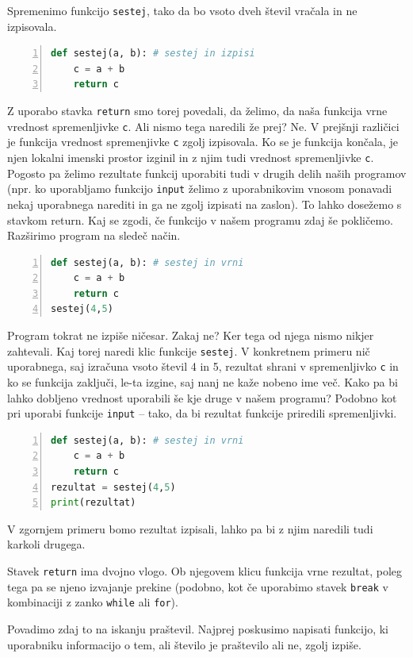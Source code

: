 Spremenimo funkcijo \texttt{sestej}, tako da bo vsoto dveh števil vračala in ne izpisovala.
\begin{lstlisting}[language=Python,numbers=left]
def sestej(a, b): # sestej in izpisi
    c = a + b
    return c
\end{lstlisting}
Z uporabo stavka \texttt{return} smo torej povedali, da želimo, da naša funkcija vrne vrednost spremenljivke \texttt{c}. Ali nismo tega naredili že prej? Ne. V prejšnji različici je funkcija vrednost spremenjivke \texttt{c} zgolj izpisovala. Ko se je funkcija končala, je njen lokalni imenski prostor izginil in z njim tudi vrednost spremenljivke \texttt{c}. Pogosto pa želimo rezultate funkcij uporabiti tudi v drugih delih naših programov (npr. ko uporabljamo funkcijo \texttt{input} želimo z uporabnikovim vnosom ponavadi nekaj uporabnega narediti in ga ne zgolj izpisati na zaslon). To lahko dosežemo s stavkom return. Kaj se zgodi, če funkcijo v našem programu zdaj še pokličemo. Razširimo program na sledeč način.
\begin{lstlisting}[language=Python,numbers=left]
def sestej(a, b): # sestej in vrni
    c = a + b
    return c
sestej(4,5)
\end{lstlisting}
Program tokrat ne izpiše ničesar. Zakaj ne? Ker tega od njega nismo nikjer zahtevali. Kaj torej naredi klic funkcije \texttt{sestej}. V konkretnem primeru nič uporabnega, saj izračuna vsoto števil 4 in 5, rezultat shrani v spremenljivko \texttt{c} in ko se funkcija zaključi, le-ta izgine, saj nanj ne kaže nobeno ime več. Kako pa bi lahko dobljeno vrednost uporabili še kje druge v našem programu? Podobno kot pri uporabi funkcije \texttt{input} -- tako, da bi rezultat funkcije priredili spremenljivki.
\begin{lstlisting}[language=Python,numbers=left]
def sestej(a, b): # sestej in vrni
    c = a + b
    return c
rezultat = sestej(4,5)
print(rezultat)
\end{lstlisting}
V zgornjem primeru bomo rezultat izpisali, lahko pa bi z njim naredili tudi karkoli drugega.


Stavek \texttt{return} ima dvojno vlogo. Ob njegovem klicu funkcija vrne rezultat, poleg tega pa se njeno izvajanje prekine (podobno, kot če uporabimo stavek \texttt{break} v kombinaciji z zanko \texttt{while} ali \texttt{for}).

Povadimo zdaj to na iskanju praštevil. Najprej poskusimo napisati funkcijo, ki uporabniku informacijo o tem, ali število je praštevilo ali ne, zgolj izpiše.

